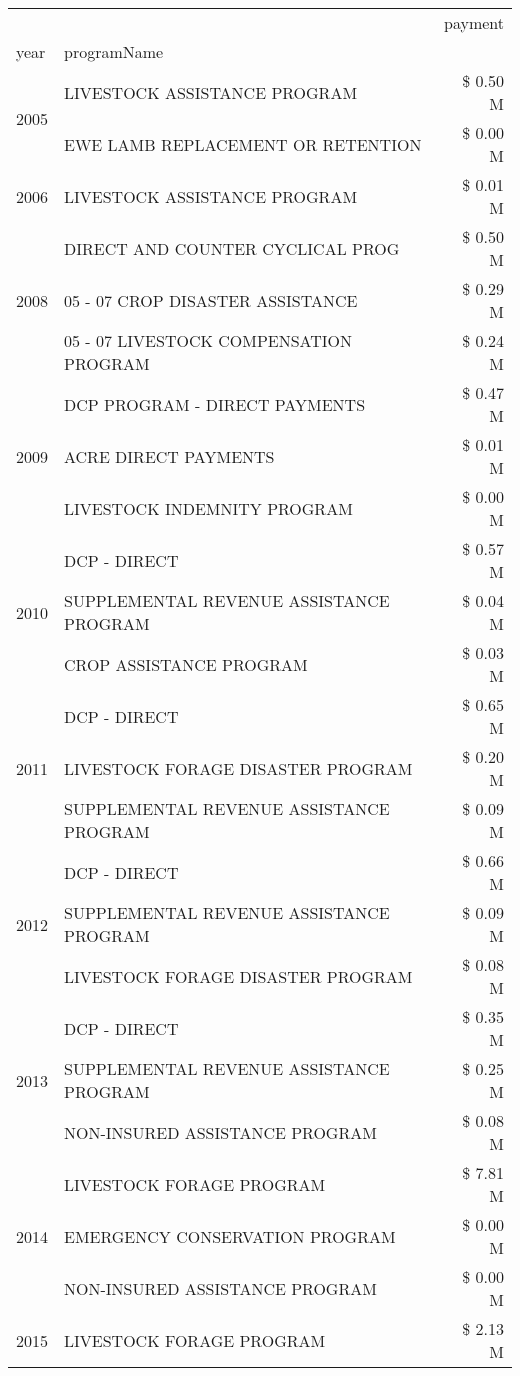 \begin{tabular}{llr}
\toprule
 &  & payment \\
year & programName &  \\
\midrule
\multirow[t]{2}{*}{2005} & LIVESTOCK ASSISTANCE PROGRAM & \$ 0.50 M \\
 & EWE LAMB REPLACEMENT OR RETENTION & \$ 0.00 M \\
\cline{1-3}
2006 & LIVESTOCK ASSISTANCE PROGRAM & \$ 0.01 M \\
\cline{1-3}
\multirow[t]{3}{*}{2008} & DIRECT AND COUNTER CYCLICAL PROG & \$ 0.50 M \\
 & 05 - 07 CROP DISASTER ASSISTANCE & \$ 0.29 M \\
 & 05 - 07 LIVESTOCK COMPENSATION PROGRAM & \$ 0.24 M \\
\cline{1-3}
\multirow[t]{3}{*}{2009} & DCP PROGRAM - DIRECT PAYMENTS & \$ 0.47 M \\
 & ACRE DIRECT PAYMENTS & \$ 0.01 M \\
 & LIVESTOCK INDEMNITY PROGRAM & \$ 0.00 M \\
\cline{1-3}
\multirow[t]{3}{*}{2010} & DCP - DIRECT & \$ 0.57 M \\
 & SUPPLEMENTAL REVENUE ASSISTANCE PROGRAM & \$ 0.04 M \\
 & CROP ASSISTANCE PROGRAM & \$ 0.03 M \\
\cline{1-3}
\multirow[t]{3}{*}{2011} & DCP - DIRECT & \$ 0.65 M \\
 & LIVESTOCK FORAGE DISASTER PROGRAM & \$ 0.20 M \\
 & SUPPLEMENTAL REVENUE ASSISTANCE PROGRAM & \$ 0.09 M \\
\cline{1-3}
\multirow[t]{3}{*}{2012} & DCP - DIRECT & \$ 0.66 M \\
 & SUPPLEMENTAL REVENUE ASSISTANCE PROGRAM & \$ 0.09 M \\
 & LIVESTOCK FORAGE DISASTER PROGRAM & \$ 0.08 M \\
\cline{1-3}
\multirow[t]{3}{*}{2013} & DCP - DIRECT & \$ 0.35 M \\
 & SUPPLEMENTAL REVENUE ASSISTANCE PROGRAM & \$ 0.25 M \\
 & NON-INSURED ASSISTANCE PROGRAM & \$ 0.08 M \\
\cline{1-3}
\multirow[t]{3}{*}{2014} & LIVESTOCK FORAGE PROGRAM & \$ 7.81 M \\
 & EMERGENCY CONSERVATION PROGRAM & \$ 0.00 M \\
 & NON-INSURED ASSISTANCE PROGRAM & \$ 0.00 M \\
\cline{1-3}
\multirow[t]{3}{*}{2015} & LIVESTOCK FORAGE PROGRAM & \$ 2.13 M \\

\end{tabular}
